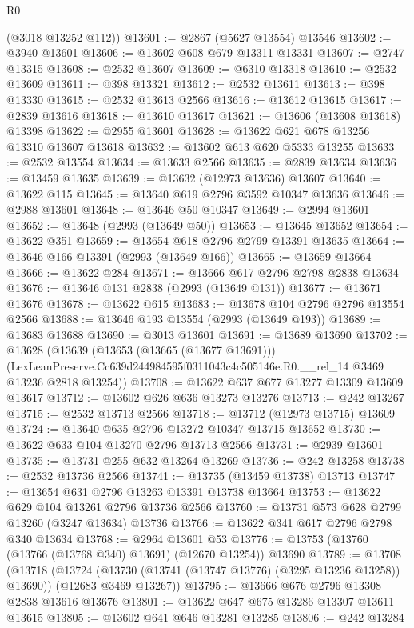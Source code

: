 \begin{lexlean}{R0}
\begin{coremodule}
      (@3018 @13252 @112))
@13601 := @2867 (@5627 @13554) @13546
@13602 := @3940 @13601
@13606 := @13602 @608 @679 @13311 @13331
@13607 := @2747 @13315
@13608 := @2532 @13607
@13609 := @6310 @13318
@13610 := @2532 @13609
@13611 := @398 @13321
@13612 := @2532 @13611
@13613 := @398 @13330
@13615 := @2532 @13613 @2566
@13616 := @13612 @13615
@13617 := @2839 @13616
@13618 := @13610 @13617
@13621 := @13606 (@13608 @13618) @13398
@13622 := @2955 @13601
@13628 := @13622 @621 @678 @13256 @13310 @13607 @13618
@13632 := @13602 @613 @620 @5333 @13255
@13633 := @2532 @13554
@13634 := @13633 @2566
@13635 := @2839 @13634
@13636 := @13459 @13635
@13639 := @13632 (@12973 @13636) @13607
@13640 := @13622 @115
@13645 := @13640 @619 @2796 @3592 @10347 @13636
@13646 := @2988 @13601
@13648 := @13646 @50 @10347
@13649 := @2994 @13601
@13652 := @13648 (@2993 (@13649 @50))
@13653 := @13645 @13652
@13654 := @13622 @351
@13659 := @13654 @618 @2796 @2799 @13391 @13635
@13664 := @13646 @166 @13391 (@2993 (@13649 @166))
@13665 := @13659 @13664
@13666 := @13622 @284
@13671 := @13666 @617 @2796 @2798 @2838 @13634
@13676 := @13646 @131 @2838 (@2993 (@13649 @131))
@13677 := @13671 @13676
@13678 := @13622 @615
@13683 := @13678 @104 @2796 @2796 @13554 @2566
@13688 := @13646 @193 @13554 (@2993 (@13649 @193))
@13689 := @13683 @13688
@13690 := @3013 @13601
@13691 := @13689 @13690
@13702 := @13628
    (@13639
      (@13653 (@13665 (@13677 @13691)))
      (LexLeanPreserve.Cc639d244984595f0311043c4c505146e.R0.__rel_14 @3469 @13236 @2818 @13254))
@13708 := @13622 @637 @677 @13277 @13309 @13609 @13617
@13712 := @13602 @626 @636 @13273 @13276
@13713 := @242 @13267
@13715 := @2532 @13713 @2566
@13718 := @13712 (@12973 @13715) @13609
@13724 := @13640 @635 @2796 @13272 @10347 @13715 @13652
@13730 := @13622 @633 @104 @13270 @2796 @13713 @2566
@13731 := @2939 @13601
@13735 := @13731 @255 @632 @13264 @13269
@13736 := @242 @13258
@13738 := @2532 @13736 @2566
@13741 := @13735 (@13459 @13738) @13713
@13747 := @13654 @631 @2796 @13263 @13391 @13738 @13664
@13753 := @13622 @629 @104 @13261 @2796 @13736 @2566
@13760 := @13731 @573 @628 @2799 @13260 (@3247 @13634) @13736
@13766 := @13622 @341 @617 @2796 @2798 @340 @13634
@13768 := @2964 @13601 @53
@13776 := @13753 (@13760 (@13766 (@13768 @340) @13691) (@12670 @13254)) @13690
@13789 := @13708
    (@13718
      (@13724 (@13730 (@13741 (@13747 @13776) (@3295 @13236 @13258)) @13690))
      (@12683 @3469 @13267))
@13795 := @13666 @676 @2796 @13308 @2838 @13616 @13676
@13801 := @13622 @647 @675 @13286 @13307 @13611 @13615
@13805 := @13602 @641 @646 @13281 @13285
@13806 := @242 @13284

\end{coremodule}
\end{lexlean}
